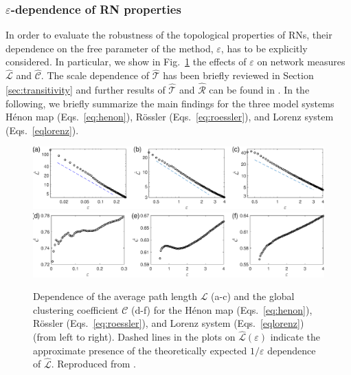 		 \subsubsection{$\varepsilon$-dependence of RN properties}
		 In order to evaluate the robustness of the topological properties of RNs, their dependence on the free parameter of the method, $\varepsilon$, has to be explicitly considered. In particular, we show in Fig.~\ref{avg_path_all} the effects of $\varepsilon$ on network measures $\hat{\mathcal{L}}$ and $\hat{\mathcal{C}}$. The scale dependence of $\hat{\mathcal{T}}$ has been briefly reviewed in Section \ref{sec:transitivity} and further results of $\hat{\mathcal{T}}$ and $\hat{\mathcal{R}}$ can be found in \cite{Donner2010a,Donner2011b}. In the following, we briefly summarize the main findings for the three model systems H\'enon map (Eqs.~\ref{eq:henon}), R\"ossler (Eqs.~\ref{eq:roessler}), and Lorenz system (Eqs.~\ref{eqlorenz}).
		 \begin{figure}
  		\centering
  			\includegraphics[width=\columnwidth]{Chapter03_RecurrenceNt/avg_henon_ros_lrz_eps.eps} \\
  			\includegraphics[width=\columnwidth]{Chapter03_RecurrenceNt/ccavg_Henon_Ros_Lrz.eps}  \\
		\caption{\small Dependence of the average path length $\mathcal{L}$ (a-c) and the global clustering coefficient $\mathcal{C}$ (d-f) for the H\'enon map (Eqs.~\ref{eq:henon}), R\"ossler (Eqs.~\ref{eq:roessler}), and Lorenz system (Eqs.~\ref{eqlorenz}) (from left to right). Dashed lines in the plots on $\hat{\mathcal{L}}(\varepsilon)$ indicate the approximate presence of the theoretically expected $1/\varepsilon$ dependence of $\hat{\mathcal{L}}$. Reproduced from \cite{Donner2011}. }  \label{avg_path_all}
		\end{figure}

